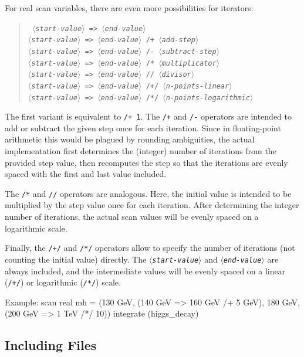 \documentclass[12pt]{book}
\newenvironment{code}%
  {\begingroup\footnotesize
   \quote
   \Verbatim}%
  {\endVerbatim
   \endquote
   \endgroup\noindent}
\newenvironment{syntax}%
  {\begin{quote}
   \begin{flushleft}\tt}%
  {\end{flushleft}
   \end{quote}}
\newcommand{\var}[1]{$\langle$\textit{#1}$\rangle$}
\newcommand{\ttt}[1]{\texttt{#1}}
\begin{document}
For real scan variables, there are even more possibilities for iterators:
\begin{syntax}
\var{start-value} \verb|=>| \var{end-value} \\
\var{start-value} \verb|=>| \var{end-value} \verb|/+| \var{add-step} \\
\var{start-value} \verb|=>| \var{end-value} \verb|/-| \var{subtract-step} \\
\var{start-value} \verb|=>| \var{end-value} \verb|/*| \var{multiplicator} \\
\var{start-value} \verb|=>| \var{end-value} \verb|//| \var{divisor} \\
\var{start-value} \verb|=>| \var{end-value} \verb|/+/| \var{n-points-linear} \\
\var{start-value} \verb|=>| \var{end-value} \verb|/*/| \var{n-points-logarithmic} \\
\end{syntax}
The first variant is equivalent to \ttt{/+ 1}.  The \ttt{/+} and
\ttt{/-} operators are intended to add or subtract the given step once
for each iteration.  Since in floating-point arithmetic this would be
plagued by rounding ambiguities, the actual implementation first
determines the (integer) number of iterations from the provided step
value, then recomputes the step so that the iterations are evenly
spaced with the first and last value included.

The \ttt{/*} and \ttt{//} operators are analogous.  Here, the initial
value is intended to be multiplied by the step value once for each
iteration.  After determining the integer number of iterations, the
actual scan values will be evenly spaced on a logarithmic scale.

Finally, the \ttt{/+/} and \ttt{/*/} operators allow to specify the
number of iterations (not counting the initial value) directly.  The
\ttt{\var{start-value}} and \ttt{\var{end-value}} are always included,
and the intermediate values will be evenly spaced on a linear
(\ttt{/+/}) or logarithmic (\ttt{/*/}) scale.

Example:
\begin{code}
scan real mh = (130 GeV,
           (140 GeV => 160 GeV /+ 5 GeV),
           180 GeV,
           (200 GeV => 1 TeV /*/ 10))
  {  integrate (higgs_decay) }
\end{code}


\subsection{Including Files}
\end{document}
